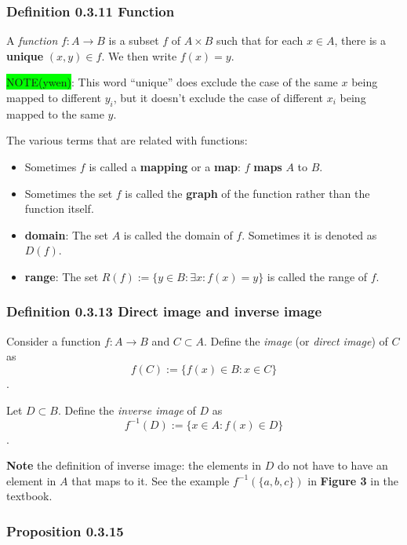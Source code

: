 \documentclass[12pt, letterpaper, oneside]{book}
\begin{document}
\subsubsection{Definition 0.3.11 Function}

A \textit{function} $f: A \rightarrow B$ is a subset $f$ of $A \times B$ such
that for each $x \in A$, there is a \textbf{unique} $(x,y) \in f$. We then
write $f(x) = y$.

\colorbox{lime}{NOTE(ywen)}: This word ``unique'' does exclude the case of the
same $x$ being mapped to different $y_i$, but it doesn't exclude the case of
different $x_i$ being mapped to the same $y$.

The various terms that are related with functions:
\begin{itemize}
  \item Sometimes $f$ is called a \textbf{mapping} or a \textbf{map}: $f$
        \textbf{maps} $A$ to $B$.
  \item Sometimes the set $f$ is called the \textbf{graph} of the function
        rather than the function itself.
  \item \textbf{domain}: The set $A$ is called the domain of $f$. Sometimes it
        is denoted as $D(f)$.
  \item \textbf{range}: The set $R(f) := \{y \in B: \exists x: f(x) = y\}$ is
        called the range of $f$.
\end{itemize}

\subsubsection{Definition 0.3.13 Direct image and inverse image}

Consider a function $f: A \rightarrow B$ and $C \subset A$. Define the
\textit{image} (or \textit{direct image}) of $C$ as \[ f(C) := \{f(x) \in B:
  x \in C\} \].

Let $D \subset B$. Define the \textit{inverse image} of $D$ as \[ f^{-1}(D) :=
  \{x \in A: f(x) \in D\}\].

\textbf{Note} the definition of inverse image: the elements in $D$ do not have
to have an element in $A$ that maps to it. See the example $f^{-1}(\{a,b,c\})$
in \textbf{Figure 3} in the textbook.

\subsubsection{Proposition 0.3.15}
\end{document}
